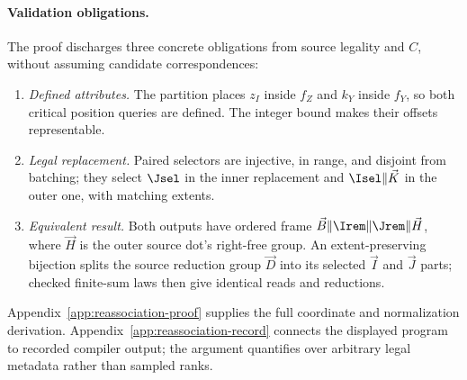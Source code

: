 \paragraph{Validation obligations.}
The proof discharges three concrete obligations from source legality and
$C$, without assuming candidate correspondences:
\begin{enumerate}
\item \emph{Defined attributes.} The partition places $z_I$ inside $f_Z$
and $k_Y$ inside $f_Y$, so both critical position queries are defined.
The integer bound makes their offsets representable.
\item \emph{Legal replacement.} Paired selectors are injective, in range,
and disjoint from batching; they select $\Jsel$ in the inner replacement
and $\Isel\Vert\vec K$ in the outer one, with matching extents.
\item \emph{Equivalent result.} Both outputs have ordered frame
$\vec B\Vert\Irem\Vert\Jrem\Vert\vec H$, where $\vec H$ is the outer
source dot's right-free group. An extent-preserving bijection splits the
source reduction group $\vec D$ into its selected $\vec I$ and $\vec J$
parts; checked finite-sum laws then give identical reads and reductions.
\end{enumerate}
Appendix~\ref{app:reassociation-proof} supplies the full coordinate and
normalization derivation. Appendix~\ref{app:reassociation-record} connects
the displayed program to recorded compiler output; the argument quantifies
over arbitrary legal metadata rather than sampled ranks.


